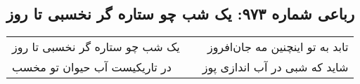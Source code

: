 \begin{center}
\section*{رباعی شماره ۹۷۳: یک شب چو ستاره گر نخسبی تا روز}
\label{sec:0973}
\begin{longtable}{l p{0.5cm} r}
یک شب چو ستاره گر نخسبی تا روز
&&
تابد به تو اینچنین مه جان‌افروز
\\
در تاریکیست آب حیوان تو مخسب
&&
شاید که شبی در آب اندازی پوز
\\
\end{longtable}
\end{center}
